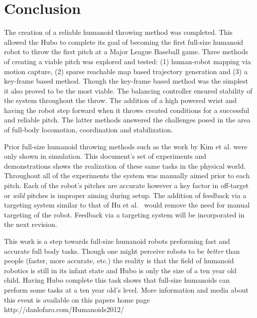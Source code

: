 \section{Conclusion}\label{sec:conclusion}
The creation of a reliable humanoid throwing method was completed. 
This allowed the Hubo to complete its goal of becoming the first full-size humanoid robot to throw the first pitch at a Major League Baseball game.
Three methods of creating a viable pitch was explored and tested: (1) human-robot mapping via motion capture, (2) sparse reachable map based trajectory generation and (3) a key-frame based method.  
Though the key-frame based method was the simplest it also proved to be the most viable.  
The balancing controller ensured stability of the system throughout the throw.  
The addition of a high powered wrist and having the robot step forward when it throws created conditions for a successful and reliable pitch.
The latter methods answered the challenges posed in the area of full-body locomotion, coordination and stabilization.

Prior full-size humanoid throwing methods such as the work by Kim et al. \cite{5686315,JooH2011438} were only shown in simulation.
This document's set of experiments and demonstrations shows the realization of these same tasks in the physical world.
Throughout all of the experiments the system was manually aimed prior to each pitch.
Each of the robot's pitches are accurate however a key factor in off-target or \textit{wild} pitches is improper aiming during setup.
The addition of feedback via a targeting system similar to that of Hu et al.~\cite{5649335} would remove the need for manual targeting of the robot.
Feedback via a targeting system will be incorporated in the next revision.

This work is a step towards full-size humanoid robots preforming fast and accurate full body tasks.
Though one might perceive robots to be \textit{better} than people (faster, more accurate, etc.) the reality is that the field of humanoid robotics is still in its infant state and Hubo is only the size of a ten year old child.
Having Hubo complete this task shows that full-size humanoids can preform some tasks at a ten year old's level.
More information and media about this event is available on this papers home page http://danlofaro.com/Humanoids2012/













